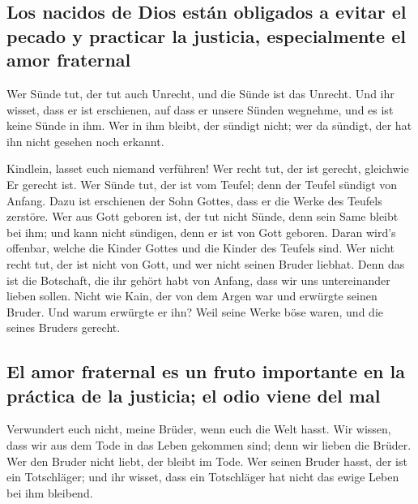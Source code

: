 \hypertarget{los-nacidos-de-dios-estuxe1n-obligados-a-evitar-el-pecado-y-practicar-la-justicia-especialmente-el-amor-fraternal}{%
\subsection{Los nacidos de Dios están obligados a evitar el pecado y
practicar la justicia, especialmente el amor
fraternal}\label{los-nacidos-de-dios-estuxe1n-obligados-a-evitar-el-pecado-y-practicar-la-justicia-especialmente-el-amor-fraternal}}

 Wer Sünde tut, der tut auch Unrecht, und die Sünde ist
das Unrecht.  Und ihr wisset, dass er ist erschienen, auf
dass er unsere Sünden wegnehme, und es ist keine Sünde in ihm.
 Wer in ihm bleibt, der sündigt nicht; wer da sündigt, der
hat ihn nicht gesehen noch erkannt.

 Kindlein, lasset euch niemand verführen! Wer recht tut,
der ist gerecht, gleichwie Er gerecht ist.  Wer Sünde tut,
der ist vom Teufel; denn der Teufel sündigt von Anfang. Dazu ist
erschienen der Sohn Gottes, dass er die Werke des Teufels zerstöre.
 Wer aus Gott geboren ist, der tut nicht Sünde, denn sein
Same bleibt bei ihm; und kann nicht sündigen, denn er ist von Gott
geboren.  Daran wird's offenbar, welche die Kinder Gottes
und die Kinder des Teufels sind. Wer nicht recht tut, der ist nicht von
Gott, und wer nicht seinen Bruder liebhat.  Denn das ist
die Botschaft, die ihr gehört habt von Anfang, dass wir uns
untereinander lieben sollen.  Nicht wie Kain, der von dem
Argen war und erwürgte seinen Bruder. Und warum erwürgte er ihn? Weil
seine Werke böse waren, und die seines Bruders gerecht.

\hypertarget{el-amor-fraternal-es-un-fruto-importante-en-la-pruxe1ctica-de-la-justicia-el-odio-viene-del-mal}{%
\subsection{El amor fraternal es un fruto importante en la práctica de
la justicia; el odio viene del
mal}\label{el-amor-fraternal-es-un-fruto-importante-en-la-pruxe1ctica-de-la-justicia-el-odio-viene-del-mal}}

 Verwundert euch nicht, meine Brüder, wenn euch die Welt
hasst.  Wir wissen, dass wir aus dem Tode in das Leben
gekommen sind; denn wir lieben die Brüder. Wer den Bruder nicht liebt,
der bleibt im Tode.  Wer seinen Bruder hasst, der ist ein
Totschläger; und ihr wisset, dass ein Totschläger hat nicht das ewige
Leben bei ihm bleibend.

